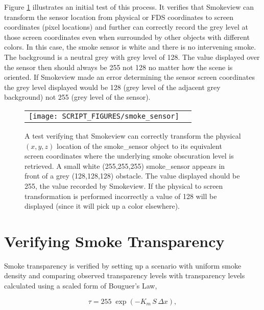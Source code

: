 \documentclass[11pt,twoside]{book}
\begin{document}
Figure \ref{figsmokesensor} illustrates an initial test of this process.
It verifies that Smokeview can transform the sensor location from physical
or FDS coordinates to screen coordinates (pixel locations) and further
can correctly record the grey level at those screen coordinates even when
surrounded by other objects with different colors.
In this case, the smoke sensor is white and there is no intervening smoke.
The background is a neutral grey with grey level of 128.
The value displayed over the sensor then should always be 255 not 128 no matter
how the scene is oriented.
If Smokeview made an error determining the sensor screen coordinates the grey level
displayed would be 128 (grey level of the adjacent grey background) not 255
(grey level of the sensor).

\begin{figure}[bph]
\begin{center}
 \centering
\begin{tabular}{cc}
\texttt{[image: SCRIPT\_FIGURES/smoke\_sensor]}&
 \end{tabular}
\end{center}
\caption[A test verifying that the Smokeview smoke\_sensor object is working properly]
{A test verifying that Smokeview can correctly transform the physical $(x,y,z)$
location of the smoke\_sensor object to its equivalent screen coordinates where
the underlying smoke obscuration level is retrieved. A small white (255,255,255)
smoke\_sensor appears in front of a grey (128,128,128) obstacle. The value displayed
should be 255,  the value recorded by Smokeview.  If the physical to screen
transformation is performed incorrectly a value of 128 will be displayed (since it
will pick up a color elsewhere).
}
\label{figsmokesensor}%
\end{figure}

\section{Verifying Smoke Transparency}
\label{sect:verify_smoke}

Smoke transparency is verified by setting up a scenario with uniform smoke density and
comparing observed transparency
levels with transparency levels calculated using a scaled form of Bouguer's Law,

\begin{equation}
\tau = 255 \; \exp(-K_m \, S \, \Delta x),
\label{eq:Beers}
\end{equation}
\end{document}
